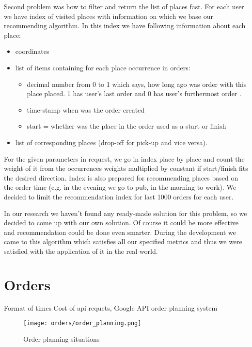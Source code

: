  Second problem was how to filter and return the list of places fast. For each user we have index of visited places with information on which we base our recommending algorithm. In this index we have following information about each place:
 \begin{itemize}
 	\item coordinates
 	\item list of items containing for each place occurrence in orders:
 	\begin{itemize}
 		\item decimal number from 0 to 1 which says, how long ago was order with this place placed. 1 has user's last order and 0 has user's furthermost order .
 		\item time-stamp when was the order created
 		\item start = whether was the place in the order used as a start or finish
 	\end{itemize}
 	\item list of corresponding places (drop-off for pick-up and vice versa).
 \end{itemize}
For the given parameters in request, we go in index place by place and count the weight of it from the occurrences weights multiplied by constant if start/finish fits the desired direction. Index is also prepared for recommending places based on the order time (e.g. in the evening we go to pub, in the morning to work). We decided to limit the recommendation index for last 1000 orders for each user.

In our research we haven't found any ready-made solution for this problem, so we decided to come up with our own solution. Of course it could be more effective and recommendation could be done even smarter. During the development we came to this algorithm which satisfies all our specified metrics and thus we were satisfied with the application of it in the real world.


\section {Orders}
Format of times
Cost of api requets, Google API
order planning system
\begin{figure}[h]\centering
	\texttt{[image: orders/order\_planning.png]}
	\caption{Order planning situations}\label{order-process-scheme}
\end{figure} 
